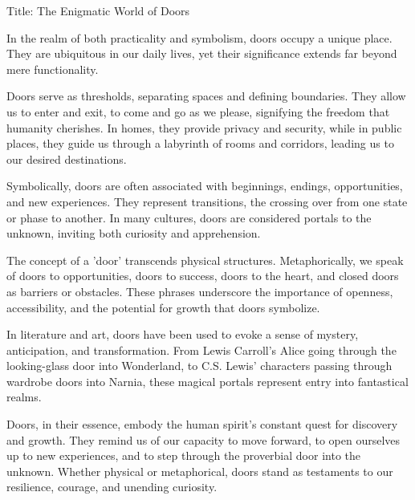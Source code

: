 Title: The Enigmatic World of Doors

In the realm of both practicality and symbolism, doors occupy a unique place. They are ubiquitous in our daily lives, yet their significance extends far beyond mere functionality.

Doors serve as thresholds, separating spaces and defining boundaries. They allow us to enter and exit, to come and go as we please, signifying the freedom that humanity cherishes. In homes, they provide privacy and security, while in public places, they guide us through a labyrinth of rooms and corridors, leading us to our desired destinations.

Symbolically, doors are often associated with beginnings, endings, opportunities, and new experiences. They represent transitions, the crossing over from one state or phase to another. In many cultures, doors are considered portals to the unknown, inviting both curiosity and apprehension.

The concept of a 'door' transcends physical structures. Metaphorically, we speak of doors to opportunities, doors to success, doors to the heart, and closed doors as barriers or obstacles. These phrases underscore the importance of openness, accessibility, and the potential for growth that doors symbolize.

In literature and art, doors have been used to evoke a sense of mystery, anticipation, and transformation. From Lewis Carroll's Alice going through the looking-glass door into Wonderland, to C.S. Lewis' characters passing through wardrobe doors into Narnia, these magical portals represent entry into fantastical realms.

Doors, in their essence, embody the human spirit's constant quest for discovery and growth. They remind us of our capacity to move forward, to open ourselves up to new experiences, and to step through the proverbial door into the unknown. Whether physical or metaphorical, doors stand as testaments to our resilience, courage, and unending curiosity.
